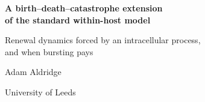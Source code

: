 \documentclass[11pt,twoside,openright]{report}
\begin{document}
\hypersetup{pageanchor=false}
\begin{titlepage}
\centering
\vspace*{4cm}
{\LARGE\bfseries A birth--death--catastrophe extension\\of the standard within-host model\par}
\vspace{6pt}
{\large Renewal dynamics forced by an intracellular process,\\and when bursting pays\par}
\vspace{2.5cm}
{\large Adam Aldridge\par}
\vspace{4pt}
{University of Leeds\par}
\end{titlepage}
\hypersetup{pageanchor=true}

\begingroup
\setlength{\parskip}{0pt}
\tableofcontents
\endgroup
\clearpage



\FloatBarrier
\begingroup
\footnotesize


\endgroup
\end{document}
